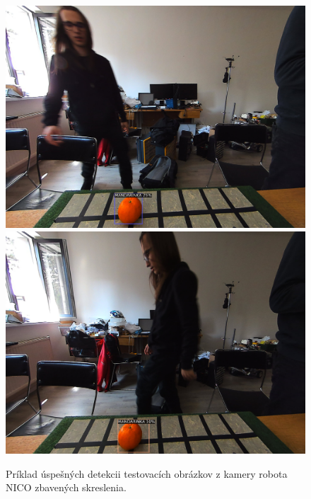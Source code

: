 \begin{figure}[H]
\includegraphics[width=\textwidth]{images/detections_screenshot_clean1.png}
\includegraphics[width=\textwidth]{images/detections_screenshot_clean2.png}
\centering
\caption{Príklad úspešných detekcii testovacích obrázkov z kamery robota NICO zbavených skreslenia.}
\label{fig:image704}
\end{figure}


